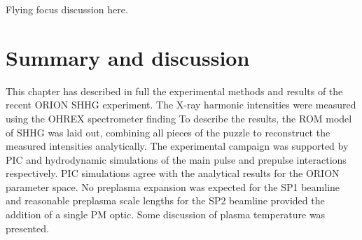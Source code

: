 

Flying focus discussion here.


\section{Summary and discussion}
This chapter has described in full the experimental methods and results of the recent ORION SHHG experiment. The X-ray harmonic intensities were measured using the OHREX spectrometer finding  To describe the results, the ROM model of SHHG was laid out, combining all pieces of the puzzle to reconstruct the measured intensities analytically. The experimental campaign was supported by PIC and hydrodynamic simulations of the main pulse and prepulse interactions respectively. PIC simulations agree with the analytical results for the ORION parameter space. No preplasma expansion was expected for the SP1 beamline and reasonable preplasma scale lengths for the SP2 beamline provided the addition of a single PM optic. Some discussion of plasma temperature was presented.

